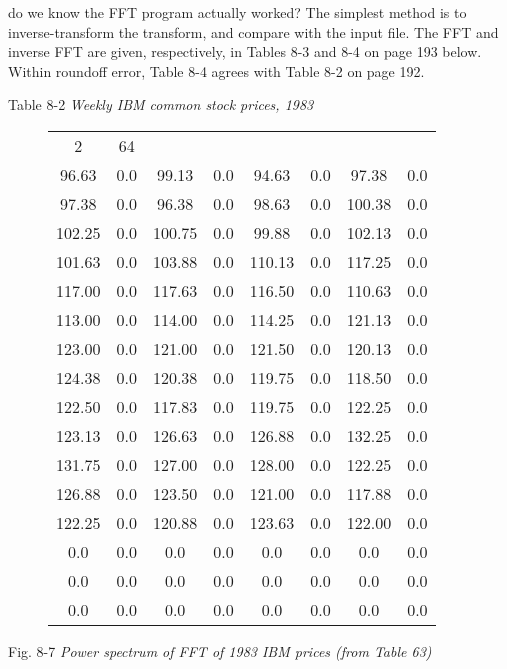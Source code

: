  do we know the FFT program actually worked? The simplest method is to inverse-transform the transform, and compare with the input file. The FFT and inverse FFT are given, respectively, in Tables 8-3 and 8-4 on page 193 below. Within roundoff error, Table 8-4 agrees with Table 8-2 on page 192.

Table 8-2 \textit{Weekly IBM common stock prices, 1983}
\begin{figure}
    \setlength{\tabcolsep}{1em}
    \begin{tabular}{cccccccc}
             2 & 64  &        &     &        &     &        &     \\
         96.63 & 0.0 &  99.13 & 0.0 &  94.63 & 0.0 &  97.38 & 0.0 \\
         97.38 & 0.0 &  96.38 & 0.0 &  98.63 & 0.0 & 100.38 & 0.0 \\
        102.25 & 0.0 & 100.75 & 0.0 &  99.88 & 0.0 & 102.13 & 0.0 \\
        101.63 & 0.0 & 103.88 & 0.0 & 110.13 & 0.0 & 117.25 & 0.0 \\
        117.00 & 0.0 & 117.63 & 0.0 & 116.50 & 0.0 & 110.63 & 0.0 \\
        113.00 & 0.0 & 114.00 & 0.0 & 114.25 & 0.0 & 121.13 & 0.0 \\
        123.00 & 0.0 & 121.00 & 0.0 & 121.50 & 0.0 & 120.13 & 0.0 \\
        124.38 & 0.0 & 120.38 & 0.0 & 119.75 & 0.0 & 118.50 & 0.0 \\
        122.50 & 0.0 & 117.83 & 0.0 & 119.75 & 0.0 & 122.25 & 0.0 \\
        123.13 & 0.0 & 126.63 & 0.0 & 126.88 & 0.0 & 132.25 & 0.0 \\
        131.75 & 0.0 & 127.00 & 0.0 & 128.00 & 0.0 & 122.25 & 0.0 \\
        126.88 & 0.0 & 123.50 & 0.0 & 121.00 & 0.0 & 117.88 & 0.0 \\
        122.25 & 0.0 & 120.88 & 0.0 & 123.63 & 0.0 & 122.00 & 0.0 \\
           0.0 & 0.0 &    0.0 & 0.0 &    0.0 & 0.0 &    0.0 & 0.0 \\
           0.0 & 0.0 &    0.0 & 0.0 &    0.0 & 0.0 &    0.0 & 0.0 \\
           0.0 & 0.0 &    0.0 & 0.0 &    0.0 & 0.0 &    0.0 & 0.0
    \end{tabular}
    \label{table:08_02}
\end{figure}

Fig. 8-7 \textit{Power spectrum of FFT of 1983 IBM prices (from Table 63)}

